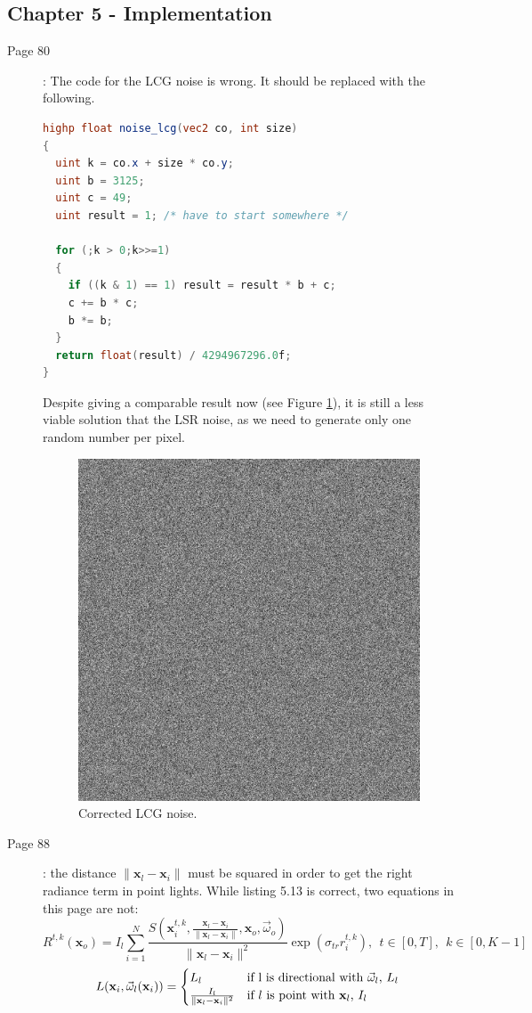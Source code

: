 \documentclass[12pt, twoside,a4paper]{article}
\newcommand{\vomega}{\vec{\omega}}
\newcommand{\x}{\mathbf{x}}
\begin{document}
\subsection{Chapter 5 - Implementation}
\begin{description}
\item [Page 80]: The code for the LCG noise is wrong. It should be replaced with the following.
\begin{lstlisting}[language=GLSL,label=lst:sinegenerator]
highp float noise_lcg(vec2 co, int size)
{
  uint k = co.x + size * co.y;
  uint b = 3125;
  uint c = 49;
  uint result = 1; /* have to start somewhere */

  for (;k > 0;k>>=1)
  {
    if ((k & 1) == 1) result = result * b + c;
    c += b * c;
    b *= b;
  }
  return float(result) / 4294967296.0f;
}
\end{lstlisting}
Despite giving a comparable result now (see Figure \ref{fig:noise}), it is still a less viable solution that the LSR noise, as we need to generate only one random number per pixel.
\begin{figure}
\centering
\includegraphics[width=0.6\linewidth]{n.png}
\caption{Corrected LCG noise.}
\label{fig:noise}
\end{figure}
\item [Page 88]: the distance $\|\x_l - \x_i\|$ must be squared in order to get the right radiance term in point lights. While listing 5.13 is correct, two equations in this page are not: 
\begin{equation*}
R^{t,k}(\x_o) = {I_l} \sum_{i = 1}^N  \frac{S(\x^{t,k}_i, \frac{\x_l - \x_i}{\|\x_l - \x_i\|}, \x_o, \vomega_o)}{{\|\x_l - \x_i\|^2}} \exp\left(\sigma_{tr} r^{t,k}_i\right), \ \ t \in [0,T], \ \ k \in [0,K-1] 
\end{equation*}
\begin{equation*}
L(\x_i, \vomega_l(\x_i)) = \begin{cases}
L_l & \text{if l is directional with $\vomega_l$, $L_l$} \\
 \frac{I_l}{\|\x_l - \x_i\|^2} & \text{if $l$ is point with $\x_l$, $I_l$}
\end{cases} \\
\end{equation*}
\end{description}
\end{document}

